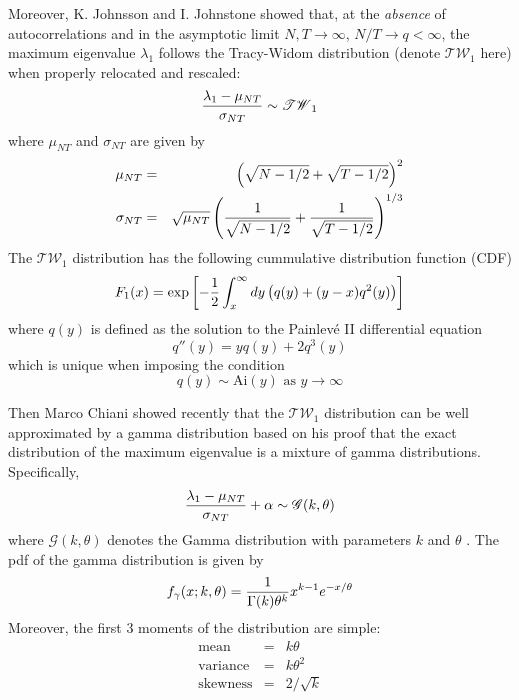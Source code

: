 Moreover, K. Johnsson \cite{Johnsson2000} and I. Johnstone
\cite{Johnstone2001} showed that, at the {\it absence} of
autocorrelations and in the asymptotic limit $N, T \to \infty$, $N/T
\to q < \infty$, the maximum eigenvalue  $\lambda_1$ follows the
Tracy-Widom distribution (denote $\mathscr{TW}_1$ here) when properly
relocated and rescaled:
\begin{equation*}
  {\lambda_1 - \mu_{NT} \over \sigma_{NT}} \sim \mathscr{TW}_1
\end{equation*}
where $\mu_{NT}$ and $\sigma_{NT}$ are given by
\begin{eqnarray*}
  \mu_{NT} &=& \left(
    \sqrt{N-1/2} + \sqrt{T - 1/2}
  \right)^2 \\
  \sigma_{NT} &=& \sqrt{\mu_{NT}} \left(
    {1 \over \sqrt{N-1/2}} + {1 \over \sqrt{T-1/2}}
  \right)^{1/3}
\end{eqnarray*}
The $\mathscr{TW}_1$ distribution has the following cummulative
distribution function (CDF) \cite{Chiani2012}
\begin{equation*}
  F_1(x) = \exp\left[
    -{1 \over 2} \int_x^\infty dy \left(q(y) + (y-x)q^2(y)\right)
  \right]
\end{equation*}
where $q(y)$ is defined as the solution to the Painlev\'e II differential
equation
\begin{equation*}
  q''(y) = yq(y) + 2q^3(y)
\end{equation*}
which is unique when imposing the condition
\begin{equation*}
  q(y) \sim \text{Ai}(y) \text{ as } y \to \infty
\end{equation*}

Then Marco Chiani showed recently that the $\mathscr{TW}_1$ distribution
can be well approximated by a gamma distribution based on his proof
that the exact distribution of the maximum eigenvalue is a mixture of
gamma distributions. Specifically,
\begin{equation}\label{eq:TracyWidom-Gamma}
  {\lambda_1 - \mu_{NT} \over \sigma_{NT}} + \alpha \sim
  \mathscr{G}(k ,\theta)
\end{equation}
where $\mathscr{G}(k, \theta)$ denotes the Gamma distribution with
parameters $k$ and $\theta$ \cite{Chiani2012}. The \gls{pdf} of the
gamma distribution is given by
\begin{equation*}
  f_\gamma(x; k, \theta) = {1 \over \Gamma(k) \theta^k} x^{k-1}
  e^{-x/\theta}
\end{equation*}
Moreover, the first 3 moments of the distribution are simple:
\begin{eqnarray*}
  \text{mean} &=& k\theta \\
  \text{variance} &=& k\theta^2 \\
  \text{skewness} &=& 2/\sqrt{k}
\end{eqnarray*}


